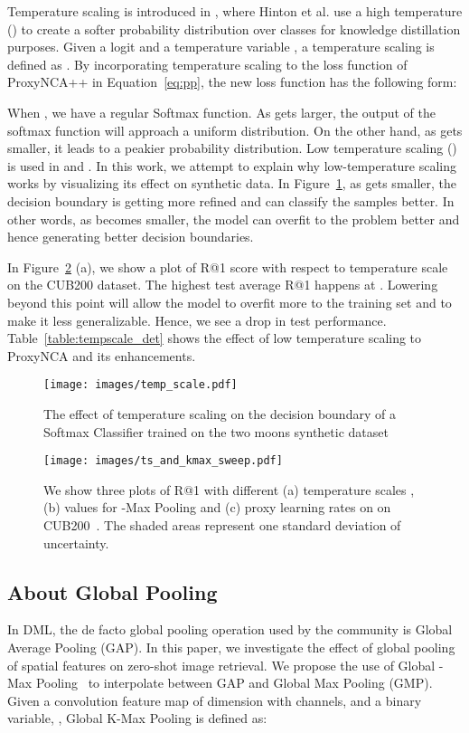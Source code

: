 \documentclass[runningheads]{llncs}
\begin{document}
Temperature scaling is introduced in \cite{hinton2015distilling}, where Hinton et al. use a high temperature () to create a softer probability distribution over classes for knowledge distillation purposes. Given a logit  and a temperature variable , a temperature scaling is defined as . By incorporating temperature scaling to the loss function of ProxyNCA++ in Equation~\ref{eq:pp}, the new loss function has the following form:



When , we have a regular Softmax function. As  gets larger, the output of the softmax function will approach a uniform distribution. On the other hand, as  gets smaller, it leads to a peakier probability distribution. Low temperature scaling () is used in \cite{wu2018improving} and \cite{zhai2019}. In this work, we attempt to explain why low-temperature scaling works by visualizing its effect on synthetic data. In Figure~\ref{fig:temp_scale}, as  gets smaller, the decision boundary is getting more refined and can classify the samples better. In other words, as  becomes smaller, the model can overfit to the problem better and hence generating better decision boundaries. 


In Figure~\ref{fig:ts_kmax} (a), we show a plot of R@1 score with respect to temperature scale on the CUB200 dataset. The highest test average R@1 happens at . Lowering  beyond this point will allow the model to overfit more to the training set and to make it less generalizable. Hence, we see a drop in test performance.
Table~\ref{table:tempscale_det} shows the effect of low temperature scaling to ProxyNCA and its enhancements.

\begin{figure}
  \centering
  \caption{The effect of temperature scaling on the decision boundary of a Softmax Classifier trained on the two moons synthetic dataset}
\texttt{[image: images/temp\_scale.pdf]}
  \label{fig:temp_scale}
\end{figure}

\begin{figure}
  \centering
  \caption{We show three plots of R@1 with different (a) temperature scales , (b)  values for -Max Pooling and (c) proxy learning rates on on CUB200~\cite{wah2011caltech}. The shaded areas represent one standard deviation of uncertainty. }
\texttt{[image: images/ts\_and\_kmax\_sweep.pdf]}
  \label{fig:ts_kmax}
\end{figure}

\subsection{About Global Pooling}
In DML, the de facto global pooling operation used by the community is Global Average Pooling (GAP).  In this paper, we investigate the effect of global pooling of spatial features on zero-shot image retrieval. We propose the use of Global -Max Pooling~\cite{durand2016weldon} to interpolate between GAP and Global Max Pooling (GMP). Given a convolution feature map of  dimension with  channels,  and a binary variable, , Global K-Max Pooling is defined as:
\end{document}
